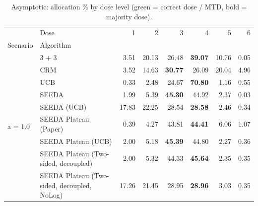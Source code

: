 \begin{table}[H]
\centering
\caption{Asymptotic: allocation \% by dose level (green = correct dose / MTD, bold = majority dose).}
\label{tab:asym_alloc_by_dose}
\begin{tabular}{llrrrrrr}
\toprule
 & Dose & 1 & 2 & 3 & 4 & 5 & 6 \\
Scenario & Algorithm &  &  &  &  &  &  \\
\midrule
\multirow[c]{9}{*}{a = 1.0} & 3 + 3 & 3.51 & 20.13 & {\cellcolor[HTML]{C8E6C9}} 26.48 & \bfseries 39.07 & 10.76 & 0.05 \\
 & CRM & 3.52 & 14.63 & {\cellcolor[HTML]{C8E6C9}} \bfseries 30.77 & 26.09 & 20.04 & 4.96 \\
 & UCB & 0.33 & 2.48 & {\cellcolor[HTML]{C8E6C9}} 24.67 & \bfseries 70.80 & 1.16 & 0.55 \\
 & SEEDA & 1.99 & 5.39 & {\cellcolor[HTML]{C8E6C9}} \bfseries 45.30 & 44.92 & 2.37 & 0.03 \\
 & SEEDA (UCB) & 17.83 & 22.25 & {\cellcolor[HTML]{C8E6C9}} 28.54 & \bfseries 28.58 & 2.46 & 0.34 \\
 & SEEDA Plateau (Paper) & 0.39 & 4.27 & {\cellcolor[HTML]{C8E6C9}} 43.81 & \bfseries 44.41 & 6.06 & 1.07 \\
 & SEEDA Plateau (UCB) & 2.00 & 5.18 & {\cellcolor[HTML]{C8E6C9}} \bfseries 45.39 & 44.80 & 2.27 & 0.36 \\
 & SEEDA Plateau (Two-sided, decoupled) & 2.00 & 5.32 & {\cellcolor[HTML]{C8E6C9}} 44.33 & \bfseries 45.64 & 2.35 & 0.35 \\
 & SEEDA Plateau (Two-sided, decoupled, NoLog) & 17.26 & 21.45 & {\cellcolor[HTML]{C8E6C9}} 28.95 & \bfseries 28.96 & 3.03 & 0.35 \\
\bottomrule
\end{tabular}
\end{table}
